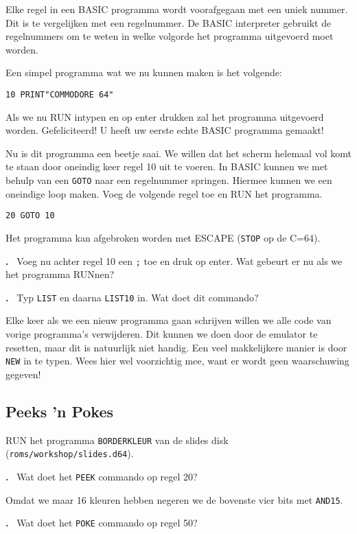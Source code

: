 \documentclass{article}
\newcounter{problem}
\newcounter{solution}
\newcommand\problem{%
  \stepcounter{problem}%
  \textbf{\theproblem.}~%
  \setcounter{solution}{0}%
}
\begin{document}
Elke regel in een BASIC programma wordt voorafgegaan met een uniek nummer.
Dit is te vergelijken met een regelnummer.
De BASIC interpreter gebruikt de regelnummers om te weten in welke volgorde het programma uitgevoerd moet worden.

Een simpel programma wat we nu kunnen maken is het volgende:

\begin{lstlisting}
10 PRINT"COMMODORE 64"
\end{lstlisting}

Als we nu RUN intypen en op enter drukken zal het programma uitgevoerd worden.
Gefeliciteerd! U heeft uw eerste echte BASIC programma gemaakt!

Nu is dit programma een beetje saai.
We willen dat het scherm helemaal vol komt te staan door oneindig keer regel 10 uit te voeren.
In BASIC kunnen we met behulp van een \verb:GOTO: naar een regelnummer springen.
Hiermee kunnen we een oneindige loop maken.
Voeg de volgende regel toe en RUN het programma.

\begin{lstlisting}
20 GOTO 10
\end{lstlisting}

Het programma kan afgebroken worden met ESCAPE (\verb:STOP: op de C=64).

\problem Voeg nu achter regel 10 een \verb:;: toe en druk op enter. Wat gebeurt er nu als we het programma RUNnen?

\problem Typ \verb:LIST: en daarna \verb:LIST10: in. Wat doet dit commando?

Elke keer als we een nieuw programma gaan schrijven willen we alle code van vorige programma's verwijderen.
Dit kunnen we doen door de emulator te resetten, maar dit is natuurlijk niet handig.
Een veel makkelijkere manier is door \verb:NEW: in te typen.
Wees hier wel voorzichtig mee, want er wordt geen waarschuwing gegeven!

\subsection{Peeks 'n Pokes}

RUN het programma \verb:BORDERKLEUR: van de slides disk (\verb:roms/workshop/slides.d64:).

\problem Wat doet het \verb:PEEK: commando op regel 20?

Omdat we maar 16 kleuren hebben negeren we de bovenste vier bits met \verb:AND15:.

\problem Wat doet het \verb:POKE: commando op regel 50?
\end{document}
